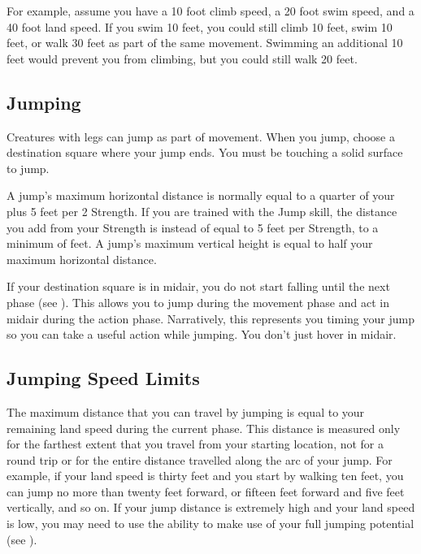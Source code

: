     For example, assume you have a 10 foot climb speed, a 20 foot swim speed, and a 40 foot land speed.
    If you swim 10 feet, you could still climb 10 feet, swim 10 feet, or walk 30 feet as part of the same movement.
    Swimming an additional 10 feet would prevent you from climbing, but you could still walk 20 feet.

  \subsection{Jumping}\label{Jumping}
    Creatures with legs can jump as part of movement.
    When you jump, choose a destination square where your jump ends.
    You must be touching a solid surface to jump.

    A jump's maximum horizontal distance is normally equal to a quarter of your  plus 5 feet per 2 Strength.
    If you are trained with the Jump skill, the distance you add from your Strength is instead of equal to 5 feet per Strength, to a minimum of  feet.
    A jump's maximum vertical height is equal to half your maximum horizontal distance.

    If your destination square is in midair, you do not start falling until the next phase (see ).
    This allows you to jump during the movement phase and act in midair during the action phase.
    Narratively, this represents you timing your jump so you can take a useful action while jumping.
    You don't just hover in midair.

  \subsection{Jumping Speed Limits}
    The maximum distance that you can travel by jumping is equal to your remaining land speed during the current phase.
    This distance is measured only for the farthest extent that you travel from your starting location, not for a round trip or for the entire distance travelled along the arc of your jump.
    For example, if your land speed is thirty feet and you start by walking ten feet, you can jump no more than twenty feet forward, or fifteen feet forward and five feet vertically, and so on.
    If your jump distance is extremely high and your land speed is low, you may need to use the  ability to make use of your full jumping potential (see ).

